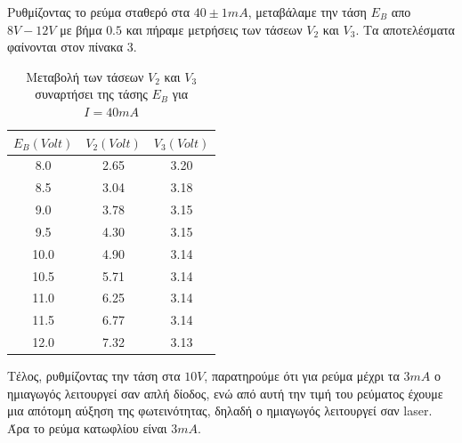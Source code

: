 \documentclass[a4paper,12pt,titlepage]{article}
\begin{document}
\newpage

Ρυθμίζοντας το ρεύμα σταθερό στα $40\pm{1}mA$, μεταβάλαμε την τάση $E_{B}$ απο $8V-12V$ με βήμα $0.5$ και πήραμε μετρήσεις των τάσεων $V_{2}$ και $V_{3}$. Τα αποτελέσματα φαίνονται στον πίνακα 3.

\begin{table}[h!]
\begin{center}
    \begin{tabular}{ | c | c | c |}
    \hline
     $E_{B}(Volt)$ & $V_{2} (Volt)$ & $V_{3} (Volt)$\\ \hline
     8.0  	& 2.65	& 3.20 \\ \hline
     8.5  	& 3.04	& 3.18 \\ \hline
     9.0  	& 3.78	& 3.15 \\ \hline
     9.5  	& 4.30	& 3.15 \\ \hline
     10.0 	& 4.90	& 3.14 \\ \hline
     10.5 	& 5.71	& 3.14 \\ \hline
     11.0 	& 6.25	& 3.14 \\ \hline
     11.5 	& 6.77	& 3.14 \\ \hline
     12.0 	& 7.32	& 3.13 \\ \hline
    \end{tabular}
\end{center}
\caption{Μεταβολή των τάσεων $V_{2}$ και $V_{3}$ συναρτήσει της τάσης $E_{B}$ για $I=40mA$}
\end{table}


Τέλος, ρυθμίζοντας την τάση στα $10V$, παρατηρούμε ότι για ρεύμα μέχρι τα $3mA$ ο ημιαγωγός λειτουργεί σαν απλή δίοδος, ενώ από αυτή την τιμή του ρεύματος έχουμε μια απότομη αύξηση της φωτεινότητας, δηλαδή ο ημιαγωγός λειτουργεί σαν laser. Άρα το ρεύμα κατωφλίου είναι $3mA$.
\end{document}
